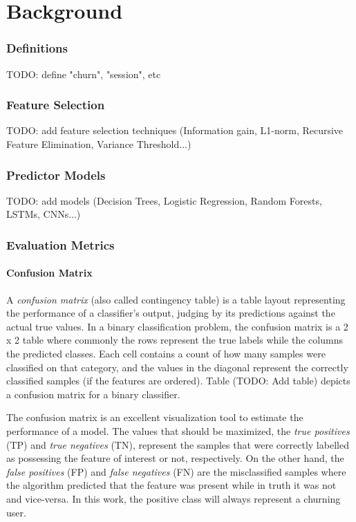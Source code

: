 \documentclass{kththesis}
\begin{document}
\chapter{Background}

\subsection{Definitions}

TODO: define "churn", "session", etc

\subsection{Feature Selection}

TODO: add feature selection techniques (Information gain, L1-norm, Recursive Feature Elimination, Variance Threshold...)

\subsection{Predictor Models}

TODO: add models (Decision Trees, Logistic Regression, Random Forests, LSTMs, CNNs...)

\subsection{Evaluation Metrics}

\subsubsection{Confusion Matrix}

A \emph{confusion matrix} (also called contingency table) is a table layout representing the performance of a classifier's output, judging by its predictions against the actual true values. In a binary classification problem, the confusion matrix is a 2 x 2 table where commonly the rows represent the true labels while the columns the predicted classes. Each cell contains a count of how many samples were classified on that category, and the values in the diagonal represent the correctly classified samples (if the features are ordered). Table (TODO: Add table) depicts a confusion matrix for a binary classifier.

The confusion matrix is an excellent visualization tool to estimate the performance of a model. The values that should be maximized, the \emph{true positives} (TP) and \emph{true negatives} (TN), represent the samples that were correctly labelled as possessing the feature of interest or not, respectively. On the other hand, the \emph{false positives} (FP) and \emph{false negatives} (FN) are the misclassified samples where the algorithm predicted that the feature was present while in truth it was not and vice-versa. In this work, the positive class will always represent a churning user.
\end{document}
